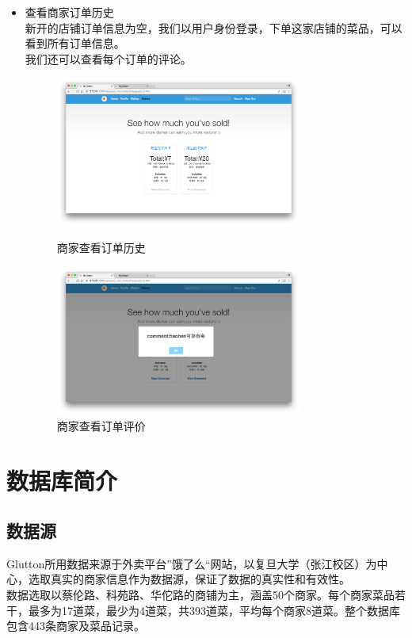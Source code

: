 \documentclass[12pt, oneside,a4paper]{article}
\begin{document}
\begin{itemize}
\begin{figure}[H]
   \end{figure}
  \item 查看商家订单历史\\
  新开的店铺订单信息为空，我们以用户身份登录，下单这家店铺的菜品，可以看到所有订单信息。\\
  我们还可以查看每个订单的评论。
  \begin{figure}[H]
   \begin{minipage}[t]{0.5\linewidth}
    \centering
     \includegraphics[width=3.2in]{re-order.jpg}
     \caption{\small{商家查看订单历史}}
   \end{minipage}
   \begin{minipage}[t]{0.5\linewidth}
    \centering
     \includegraphics[width=3.2in]{re-order-comment.jpg}
      \caption{\small{商家查看订单评价}}
   \end{minipage}
   \end{figure} 
  \end{itemize}

\section{数据库简介}
\subsection{数据源}
Glutton所用数据来源于外卖平台”饿了么“网站，以复旦大学（张江校区）为中心，选取真实的商家信息作为数据源，保证了数据的真实性和有效性。\\
数据选取以蔡伦路、科苑路、华佗路的商铺为主，涵盖50个商家。每个商家菜品若干，最多为17道菜，最少为4道菜，共393道菜，平均每个商家8道菜。整个数据库包含443条商家及菜品记录。
\end{document}
